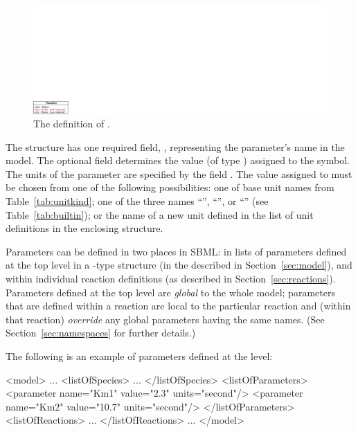 \documentclass[10pt]{cekarticle}
\newcommand{\vref}[1]{\ref{#1}}
\newcommand{\changed}[1]{\textcolor{BrickRed}{#1}}
\begin{document}
\begin{figure}[htb]
  \centering
  \includegraphics[scale = 0.68]{parameter}
  \caption{The definition of .}
  \label{fig:parameter}
\end{figure}

\changed{The  structure has one required field,
  \attrib{name}, representing the parameter's name in the model.}  The
\changed{optional} field  determines the value (of type
) assigned to the symbol.  The units of the parameter
 are specified by the field .  The value
assigned to  must be chosen from one of the following
possibilities: one of base unit names from Table~\vref{tab:unitkind}; one
of the three names ``'', ``'', or
``'' (see Table~\ref{tab:builtin}); or the name of a new
unit defined in the list of unit definitions in the enclosing 
structure.

Parameters \changed{can be defined} in two places in SBML: in lists of
parameters defined at the top level in a -type structure
\changed{(in the  described in
  Section~\ref{sec:model})}, and within individual reaction definitions
\changed{(as described in Section~\ref{sec:reactions})}.  Parameters
defined at the top level are \emph{global} to the whole model; parameters
that are defined within a reaction are local to the particular reaction and
(within that reaction) \emph{override} any global parameters having the
same names.  (See Section~\ref{sec:namespaces} for further details.)

The following is an example of parameters defined at the  level:

\begin{example}
<model>
    ...
    <listOfSpecies>
        ...
    </listOfSpecies>
    <listOfParameters>
        <parameter name="Km1" value="2.3" units="second"/>
        <parameter name="Km2" value="10.7" units="second"/>
    </listOfParameters>
    <listOfReactions>
        ...
    </listOfReactions>
    ...
</model>
\end{example}
\end{document}
